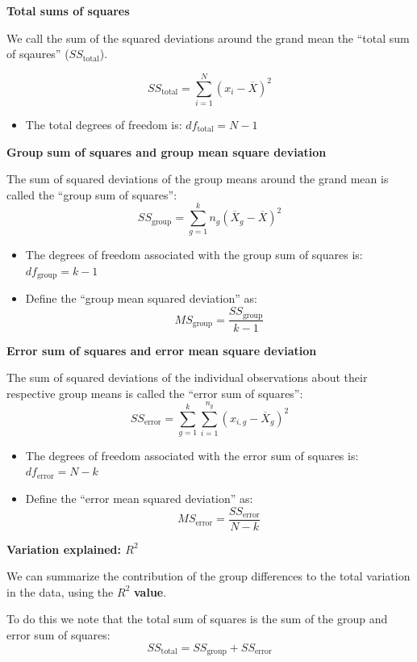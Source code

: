 \documentclass[]{book}
\providecommand{\tightlist}{%
  \setlength{\itemsep}{0pt}\setlength{\parskip}{0pt}}
\theoremstyle{definition}
\theoremstyle{definition}
\theoremstyle{definition}
\theoremstyle{remark}
\begin{document}
\textbf{Total sums of squares}

We call the sum of the squared deviations around the grand mean the
``total sum of sqaures'' (\(SS_\text{total}\)).

\[
SS_\text{total} = \sum_{i=1}^N (x_i-\overline{X})^2
\]

\begin{itemize}
\tightlist
\item
  The total degrees of freedom is: \(df_\text{total} = N - 1\)
\end{itemize}

\textbf{Group sum of squares and group mean square deviation}

The sum of squared deviations of the group means around the grand mean
is called the ``group sum of squares'': \[
SS_\text{group} = \sum_{g=1}^kn_g(\overline{X}_g - \overline{X})^2
\]

\begin{itemize}
\item
  The degrees of freedom associated with the group sum of squares is:
  \(df_\text{group} = k - 1\)
\item
  Define the ``group mean squared deviation'' as: \[
  MS_\text{group} = \frac{SS_\text{group}}{k-1}
  \]
\end{itemize}

\textbf{Error sum of squares and error mean square deviation}

The sum of squared deviations of the individual observations about their
respective group means is called the ``error sum of squares'': \[
SS_\text{error} = \sum_{g=1}^k\sum_{i=1}^{n_g} (x_{i,g} - \overline{X}_g)^2
\]

\begin{itemize}
\item
  The degrees of freedom associated with the error sum of squares is:
  \(df_\text{error} = N - k\)
\item
  Define the ``error mean squared deviation'' as: \[
  MS_\text{error} = \frac{SS_\text{error}}{N-k}
  \]
\end{itemize}

\textbf{Variation explained: \(R^2\)}

We can summarize the contribution of the group differences to the total
variation in the data, using the \(R^2\) \textbf{value}.

To do this we note that the total sum of squares is the sum of the group
and error sum of squares: \[
SS_\text{total} = SS_\text{group} + SS_\text{error}
\]
\end{document}
